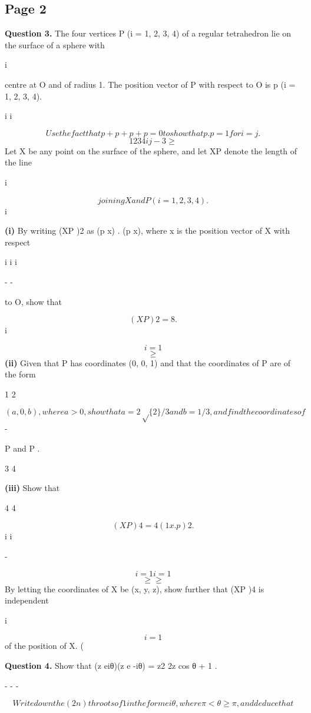 \documentclass[12pt]{article}
\begin{document}
\subsection*{Page 2}
\begin{flushleft}
\bigskip\textbf{Question 3.} The four vertices P (i = 1, 2, 3, 4) of a regular tetrahedron lie on the surface of a sphere with\par
i\par
centre at O and of radius 1. The position vector of P with respect to O is p (i = 1, 2, 3, 4).\par
i i\par
\[Use the fact that p + p + p + p = 0 to show that p . p = 1 for i = j.\]
\[1 2 3 4 i j - 3 \geq\]
Let X be any point on the surface of the sphere, and let XP denote the length of the line\par
i\par
\[joining X and P (i = 1, 2, 3, 4).\]
i\par
\textbf{(i)} By writing (XP )2 as (p x) . (p x), where x is the position vector of X with respect\par
i i i\par
- -\par
to O, show that\par
\[(XP )2 = 8 .\]
i\par
\[i=1\]
\[\geq\]
\textbf{(ii)} Given that P has coordinates (0, 0, 1) and that the coordinates of P are of the form\par
1 2\par
\[(a, 0, b), where a > 0, show that a = 2\sqrt\{2\}/3 and b = 1/3, and find the coordinates of\]
-\par
P and P .\par
3 4\par
\textbf{(iii)} Show that\par
4 4\par
\[(XP )4 = 4 (1 x . p )2 .\]
i i\par
-\par
\[i=1 i=1\]
\[\geq \geq\]
By letting the coordinates of X be (x, y, z), show further that (XP )4 is independent\par
i\par
\[i=1\]
of the position of X. (\par
\bigskip\textbf{Question 4.} Show that (z eiθ)(z e -iθ) = z2 2z cos θ + 1 .\par
- - -\par
\[Write down the (2n)th roots of 1 in the form eiθ, where \pi < θ \geq \pi, and deduce that\]

\end{flushleft}
\end{document}
